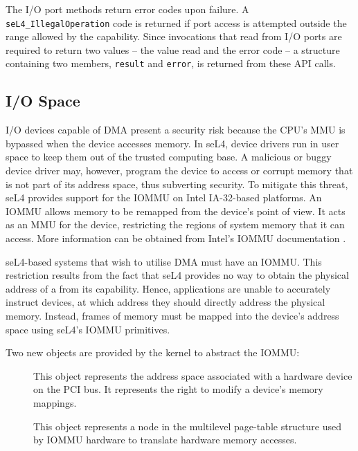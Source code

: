 The I/O port methods return error codes upon failure.
A \texttt{seL4\_IllegalOperation} code is returned if port access is
attempted outside the range allowed by the  capability. 
Since invocations that
read from I/O ports are required to return two values -- the value read
and the error code -- a structure containing two members, \texttt{result}
and \texttt{error}, is returned from these API calls.

\subsection{I/O Space}
\label{sec:iospace}

I/O devices capable of DMA present a security risk because the CPU's MMU
is bypassed when the device accesses memory. In seL4, device drivers run
in user space to keep them out of the trusted computing base.
A malicious or buggy device driver may, however, program the device to
access or corrupt memory that is not part of its address space, thus
subverting security. To mitigate this threat, seL4 provides support for
the IOMMU on Intel IA-32-based platforms. An IOMMU allows memory to be
remapped from the device's point of view. It acts as an MMU for the
device, restricting the regions of system memory that it can access.
More information can be obtained from Intel's IOMMU documentation \cite{extra:vtd}.

seL4-based systems that wish to utilise DMA must have an IOMMU.
This restriction results from the fact that seL4 provides no way to obtain the physical address of a  from its capability.
Hence, applications are unable to accurately instruct devices,
at which address they should directly address the physical memory.
Instead, frames of memory must be mapped into the device's address space using seL4's IOMMU primitives.

Two new objects are provided by the kernel to abstract the IOMMU:
\begin{description}

    \item[] This object represents the address space associated
    with a hardware device on the PCI bus. It represents the right to
    modify a device's memory mappings.

    \item[] This object represents a node in the multilevel
    page-table structure used by IOMMU hardware to translate hardware
    memory accesses.

\end{description}

